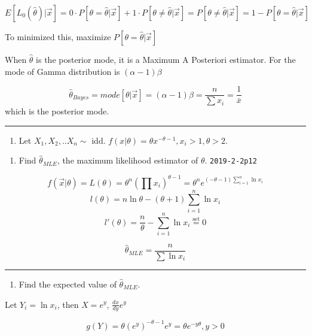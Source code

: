\documentclass[12pt,]{article}
\providecommand{\tightlist}{%
  \setlength{\itemsep}{0pt}\setlength{\parskip}{0pt}}
\begin{document}
\[E[L_0(\hat\theta)|\vec x]=0\cdot P[\theta=\hat\theta|\vec x]+1\cdot P[\theta\neq\hat\theta|\vec x]=P[\theta\neq\hat\theta|\vec x]=1-P[\theta=\hat\theta|\vec x]\]

To minimized this, maximize \(P[\theta=\hat\theta|\vec x]\)

When \(\hat\theta\) is the posterior mode, it is a Maximum A Posteriori
estimator. For the mode of Gamma distribution is \((\alpha-1)\beta\)

\[\hat\theta_{Bayes}=mode[\theta|\vec x]=(\alpha-1)\beta=\frac{n}{\sum x_i}=\frac{1}{\bar x}\]
which is the posterior mode.

\begin{center}\rule{0.5\linewidth}{\linethickness}\end{center}

\begin{enumerate}
\def\labelenumi{\arabic{enumi}.}
\setcounter{enumi}{4}
\tightlist
\item
  \textcolor[rgb]{0.5,0.5,0.5}{Let $X_1,X_2,..X_n\sim$ idd. $f(x|\theta)=\theta x^{-\theta-1}, x_i>1, \theta>2$.}
\end{enumerate}

\begin{enumerate}
\def\labelenumi{\alph{enumi}.}
\tightlist
\item
  \textcolor[rgb]{0.5,0.5,0.5}{Find $\hat\theta_{MLE}$, the maximum likelihood estimator of $\theta$.}
  \texttt{2019-2-2p12}
\end{enumerate}

\[f(\vec x|\theta)=L(\theta)=\theta^n(\prod x_i)^{\theta-1}=\theta^n e^{(-\theta-1)\sum^n_{i=1} \ln x_i}\]
\[l(\theta)=n\ln\theta-(\theta+1)\sum^n_{i=1} \ln x_i\]
\[l'(\theta)=\frac{n}\theta-\sum^n_{i=1} \ln x_i\overset{\text{set}}{=}0\]

\[\hat\theta_{MLE}=\frac{n}{\sum\ln x_i}\]

\begin{center}\rule{0.5\linewidth}{\linethickness}\end{center}

\begin{enumerate}
\def\labelenumi{\alph{enumi}.}
\setcounter{enumi}{1}
\tightlist
\item
  \textcolor[rgb]{0.5,0.5,0.5}{Find the expected value of $\hat\theta_{MLE}$.}
\end{enumerate}

Let \(Y_i=\ln x_i\), then \(X=e^y\), \(\frac{dx}{dy}e^y\)

\[g(Y)=\theta(e^y)^{-\theta-1}e^y=\theta e^{-y\theta}, y>0\]
\end{document}
